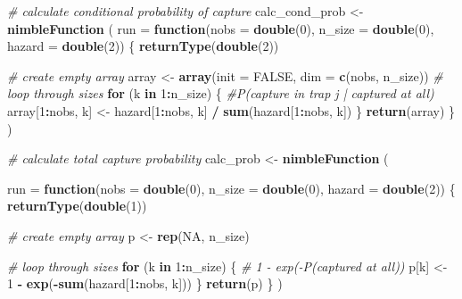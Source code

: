 \documentclass[
]{article}
\newenvironment{Shaded}{\begin{snugshade}}{\end{snugshade}}
\newcommand{\AttributeTok}[1]{\textcolor[rgb]{0.13,0.29,0.53}{#1}}
\newcommand{\CommentTok}[1]{\textcolor[rgb]{0.56,0.35,0.01}{\textit{#1}}}
\newcommand{\ConstantTok}[1]{\textcolor[rgb]{0.56,0.35,0.01}{#1}}
\newcommand{\ControlFlowTok}[1]{\textcolor[rgb]{0.13,0.29,0.53}{\textbf{#1}}}
\newcommand{\DecValTok}[1]{\textcolor[rgb]{0.00,0.00,0.81}{#1}}
\newcommand{\FunctionTok}[1]{\textcolor[rgb]{0.13,0.29,0.53}{\textbf{#1}}}
\newcommand{\NormalTok}[1]{#1}
\newcommand{\OtherTok}[1]{\textcolor[rgb]{0.56,0.35,0.01}{#1}}
\newcommand{\SpecialCharTok}[1]{\textcolor[rgb]{0.81,0.36,0.00}{\textbf{#1}}}
\begin{document}
\begin{Shaded}
\begin{Highlighting}[]
\CommentTok{\# calculate conditional probability of capture}
\NormalTok{calc\_cond\_prob }\OtherTok{\textless{}{-}} \FunctionTok{nimbleFunction}\NormalTok{ (}
  \AttributeTok{run =} \ControlFlowTok{function}\NormalTok{(}\AttributeTok{nobs =} \FunctionTok{double}\NormalTok{(}\DecValTok{0}\NormalTok{), }\AttributeTok{n\_size =} \FunctionTok{double}\NormalTok{(}\DecValTok{0}\NormalTok{), }\AttributeTok{hazard =} \FunctionTok{double}\NormalTok{(}\DecValTok{2}\NormalTok{))}
\NormalTok{  \{}
    \FunctionTok{returnType}\NormalTok{(}\FunctionTok{double}\NormalTok{(}\DecValTok{2}\NormalTok{))}
    
    \CommentTok{\# create empty array}
\NormalTok{    array }\OtherTok{\textless{}{-}} \FunctionTok{array}\NormalTok{(}\AttributeTok{init =} \ConstantTok{FALSE}\NormalTok{, }\AttributeTok{dim =} \FunctionTok{c}\NormalTok{(nobs, n\_size))}
    \CommentTok{\# loop through sizes}
    \ControlFlowTok{for}\NormalTok{ (k }\ControlFlowTok{in} \DecValTok{1}\SpecialCharTok{:}\NormalTok{n\_size) \{}
      \CommentTok{\#P(capture in trap j | captured at all)}
\NormalTok{      array[}\DecValTok{1}\SpecialCharTok{:}\NormalTok{nobs, k] }\OtherTok{\textless{}{-}}\NormalTok{ hazard[}\DecValTok{1}\SpecialCharTok{:}\NormalTok{nobs, k] }\SpecialCharTok{/} \FunctionTok{sum}\NormalTok{(hazard[}\DecValTok{1}\SpecialCharTok{:}\NormalTok{nobs, k])}
\NormalTok{    \}}
    \FunctionTok{return}\NormalTok{(array)}
\NormalTok{  \}}
\NormalTok{)}

\CommentTok{\# calculate total capture probability}
\NormalTok{calc\_prob }\OtherTok{\textless{}{-}} \FunctionTok{nimbleFunction}\NormalTok{ (}
    
  \AttributeTok{run =} \ControlFlowTok{function}\NormalTok{(}\AttributeTok{nobs =} \FunctionTok{double}\NormalTok{(}\DecValTok{0}\NormalTok{), }\AttributeTok{n\_size =} \FunctionTok{double}\NormalTok{(}\DecValTok{0}\NormalTok{), }\AttributeTok{hazard =} \FunctionTok{double}\NormalTok{(}\DecValTok{2}\NormalTok{))}
\NormalTok{  \{}
    \FunctionTok{returnType}\NormalTok{(}\FunctionTok{double}\NormalTok{(}\DecValTok{1}\NormalTok{))}

    \CommentTok{\# create empty array}
\NormalTok{    p }\OtherTok{\textless{}{-}} \FunctionTok{rep}\NormalTok{(}\ConstantTok{NA}\NormalTok{, n\_size)}

    \CommentTok{\# loop through sizes}
    \ControlFlowTok{for}\NormalTok{ (k }\ControlFlowTok{in} \DecValTok{1}\SpecialCharTok{:}\NormalTok{n\_size) \{}
      \CommentTok{\# 1 {-} exp({-}P(captured at all))}
\NormalTok{      p[k] }\OtherTok{\textless{}{-}} \DecValTok{1} \SpecialCharTok{{-}} \FunctionTok{exp}\NormalTok{(}\SpecialCharTok{{-}}\FunctionTok{sum}\NormalTok{(hazard[}\DecValTok{1}\SpecialCharTok{:}\NormalTok{nobs, k]))}
\NormalTok{    \}}
    \FunctionTok{return}\NormalTok{(p)}
\NormalTok{  \}}
\NormalTok{)}
\end{Highlighting}
\end{Shaded}
\end{document}
